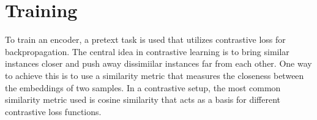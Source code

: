 \documentclass[conference]{IEEEtran}
\begin{document}
\section{Training}
To train an encoder, a pretext task is used that utilizes contrastive loss for backpropagation. The central idea in contrastive learning is to bring similar instances closer and push away dissimiilar instances far from each other.
One way to achieve this is to use a similarity metric that measures the closeness between the embeddings of two samples. In a contrastive setup, the most common similarity metric used is cosine similarity that acts as a basis for different contrastive loss functions.



\end{document}
